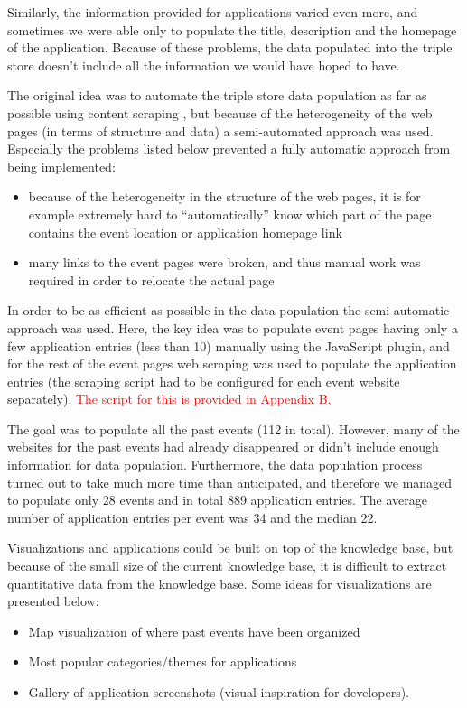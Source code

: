 Similarly, the information provided for applications varied even more, and sometimes we were able only to populate the title, description and the homepage of the application. Because of these problems, the data populated into the triple store doesn't include all the information we would have hoped to have.

The original idea was to automate the triple store data population as far as possible using content scraping , but because of the heterogeneity of the web pages (in terms of structure and data)  a semi-automated approach was used. Especially the problems listed below prevented a fully automatic approach from being implemented:

\begin{itemize}
\item because of the heterogeneity in the structure of the web pages, it is for example extremely hard to ``automatically'' know which part of the page contains the event location or application homepage link
\item many links to the event pages were broken, and thus manual work was required in order to relocate the actual page
\end{itemize}

In order to be as efficient as possible in the data population the semi-automatic approach was used. Here, the key idea was to populate event pages having only a few application entries (less than 10) manually using the JavaScript plugin, and for the rest of the event pages web scraping was used to populate the application entries (the scraping script had to be configured for each event website separately). \textcolor{red}{The script for this is provided in Appendix B.}

The goal was to populate all the past events (112 in total). However, many of the websites for the past events had already disappeared or didn't include enough information for data population. Furthermore, the data population process turned out to take much more time than anticipated, and therefore we managed to populate only 28 events and in total 889 application entries. The average number of application entries per event was 34 and the median 22.

Visualizations and applications could be built on top of the knowledge base, but because of the small size of the current knowledge base, it is difficult to extract quantitative data from the knowledge base. Some ideas for visualizations are presented below:
\begin{itemize}
\item Map visualization of where past events have been organized
\item Most popular categories/themes for applications
\item Gallery of application screenshots (visual inspiration for developers).
\end{itemize}


